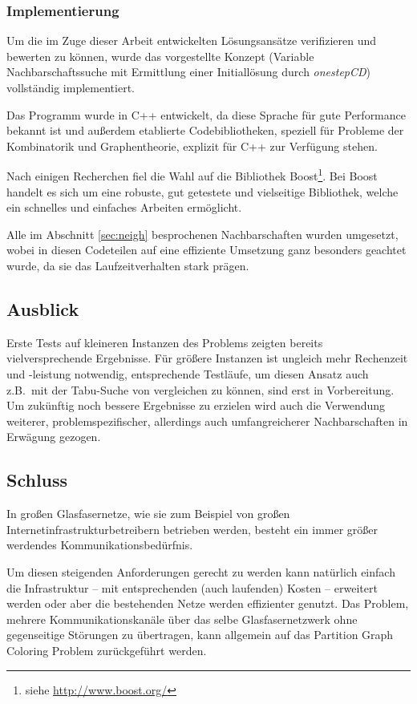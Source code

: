 \documentclass[paper=a4,fontsize=12pt]{scrartcl}
\begin{document}
\subsubsection{Implementierung}
Um die im Zuge dieser Arbeit entwickelten Lösungsansätze verifizieren und bewerten zu können, wurde das vorgestellte Konzept (Variable Nachbarschaftssuche mit Ermittlung einer Initiallösung durch \emph{onestepCD}) vollständig implementiert.

Das Programm wurde in C++ entwickelt, da diese Sprache für gute Performance bekannt ist und außerdem etablierte Codebibliotheken, speziell für Probleme der Kombinatorik und Graphentheorie, explizit für C++ zur Verfügung stehen.

Nach einigen Recherchen fiel die Wahl auf die Bibliothek Boost\footnote{siehe \url{http://www.boost.org/}}. Bei Boost handelt es sich um eine robuste, gut getestete und vielseitige Bibliothek, welche ein schnelles und einfaches Arbeiten ermöglicht.

Alle im Abschnitt \ref{sec:neigh} besprochenen Nachbarschaften wurden umgesetzt, wobei in diesen Codeteilen auf eine effiziente Umsetzung ganz besonders geachtet wurde, da sie das Laufzeitverhalten stark prägen.

\subsection{Ausblick}

Erste Tests auf kleineren Instanzen des Problems zeigten bereits vielversprechende Ergebnisse. Für größere Instanzen ist ungleich mehr Rechenzeit und -leistung notwendig, entsprechende Testläufe, um diesen Ansatz auch z.B.\ mit der Tabu-Suche von \citet*{Noronha2006} vergleichen zu können, sind erst in Vorbereitung. Um zukünftig noch bessere Ergebnisse zu erzielen wird auch die Verwendung  weiterer, problemspezifischer, allerdings auch umfangreicherer Nachbarschaften in Erwägung gezogen.

\subsection{Schluss}
In großen Glasfasernetze, wie sie zum Beispiel von großen Internetinfrastrukturbetreibern betrieben werden, besteht ein immer größer werdendes Kommunikationsbedürfnis.

Um diesen steigenden Anforderungen gerecht zu werden kann natürlich einfach die Infrastruktur -- mit entsprechenden (auch laufenden) Kosten -- erweitert werden oder aber die bestehenden Netze werden effizienter genutzt. Das Problem, mehrere Kommunikationskanäle über das selbe Glasfasernetzwerk ohne gegenseitige Störungen zu übertragen, kann allgemein auf das Partition Graph Coloring Problem zurückgeführt werden.
\end{document}
